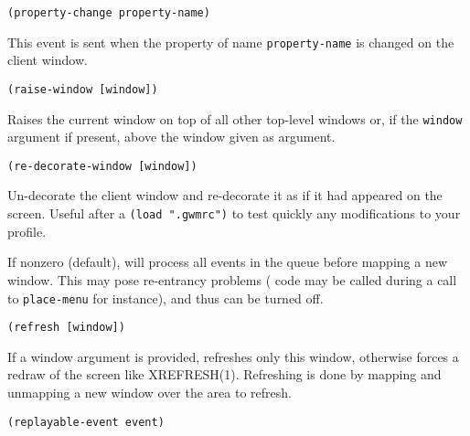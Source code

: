 {\usagefont\begin{verbatim}
(property-change property-name)
\end{verbatim}}\usageupspace

This event is sent when the property of name \verb"property-name" is changed
on the client window.

        
{\usagefont\begin{verbatim}
(raise-window [window])
\end{verbatim}}\usageupspace

Raises  the current window on top of all other top-level windows or, if the
\verb"window" argument if present, above the window given as argument.

        
{\usagefont\begin{verbatim}
(re-decorate-window [window])
\end{verbatim}}\usageupspace

Un-decorate the client window and re-decorate it as if it had appeared on
the screen. Useful after a \verb|(load ".gwmrc")| to test quickly any
modifications to your profile.

        

If nonzero (default), {\GWM} will process all events in the queue before
mapping a new window. This may pose re-entrancy problems ({\WOOL} code
may be called during a call to \verb"place-menu" for instance), and
thus can be turned off.

        
{\usagefont\begin{verbatim}
(refresh [window])
\end{verbatim}}\usageupspace

If a window argument is provided, refreshes only this window, otherwise 
forces a redraw of the screen like XREFRESH(1). Refreshing is done by mapping
and unmapping a new window over the area to refresh.


{\usagefont\begin{verbatim}
(replayable-event event)
\end{verbatim}}\usageupspace

